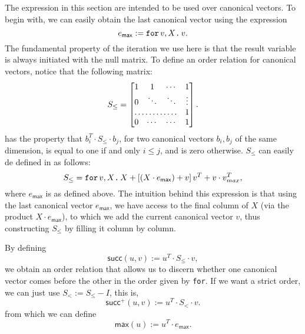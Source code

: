 The expression in this section are intended to be used over canonical vectors.
To begin with, we can easily obtain the last canonical vector using the expression 
$$
e_{\mathsf{max}} := \texttt{for}\, v,X \texttt{.}\, v.
$$ 
The fundamental property of the iteration we use here is that the result variable is always 
initiated with the null matrix.
To define an order relation for canonical vectors, notice that the following matrix:
\[
S_{\leq} = \begin{bmatrix}
    1 & 1 & \cdots &  1 \\
    0 & \ddots & \ddots & \vdots \\
    \hdotsfor{3} & 1 \\
    0 & \cdots & \cdots & 1 
\end{bmatrix}.
\]
has the property that $b_i^T\cdot S_{\leq} \cdot b_j$, for two canonical vectors $b_i,b_j$ of the same dimension, 
is equal to one if and only $i\leq j$, and is zero otherwise. $S_{\leq}$ can easily de defined in \langfor as 
follows:
$$
S_{\leq}=\texttt{for}\, v,X \texttt{.}\, X + \left[ (X\cdot e_{\mathsf{max}}) + v \right]v^T + v\cdot v^T_{max},
$$
where $e_{\mathsf{max}}$ is as defined above. The intuition behind this expression is that using 
the last canonical vector $e_{\mathsf{max}}$, we have access to the final column of $X$ 
(via the product $X\cdot e_{\mathsf{max}}$), to which we add the current canonical vector $v$, thus 
constructing $S_{\leq}$ by filling it column by column.

By defining 
$$
\mathsf{succ}(u,v) := u^T\cdot S_{\leq} \cdot v,
$$
we obtain an order relation that allows us to discern whether one canonical vector comes before 
the other in the order given by \texttt{for}. If we want a strict order, we can just use 
$S_< := S_{\leq} - I$, this is, $$\mathsf{succ}^+(u,v) := u^T\cdot S_{<} \cdot v.$$
from which we can define 
$$
\mathsf{max}(u):=u^T\cdot e_{\mathsf{max}}.
$$

